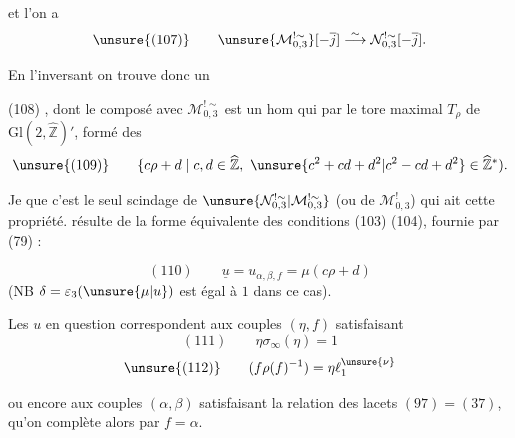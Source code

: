 
et l'on a
\[
 \unsure{(107)}\qquad
 \unsure{\mathcal M_{0,3}^{!\sim}}[-\overline{j}]
 \overset{\sim}{\longrightarrow}
 \mathcal N_{0,3}^{!\sim}[-\overline{j}].
\]

En l'inversant on trouve donc un

(108)
,
dont le composé avec $\mathcal M_{0,3}^{!\sim}$ est un hom qui
par le tore maximal $T_\rho$ de $\mathrm{Gl}(2,\widehat{\mathbb Z})'$,
formé des
\[
 \unsure{(109)}\qquad
 \{c\rho+d\mid c,d\in\widehat{\mathbb Z},\
 \unsure{c^2+cd+d^2|c^2-cd+d^2}\in\widehat{\mathbb Z}^{*}).
\]

Je  que c'est le seul scindage de
$\unsure{\mathcal N_{0,3}^{!\sim}|\mathcal M_{0,3}^{!\sim}}$
(ou  de $\mathcal M_{0,3}^{!}$)
qui ait cette propriété.  résulte de la forme équivalente
des conditions (103) (104), fournie par (79) :



\[
 (110)\qquad
 \underline{u}=u_{\alpha,\beta,f}=\mu(c\rho+d)
\]
(NB $\delta=\varepsilon_3(\unsure{\mu|u})$ est égal à $1$ dans ce cas).

Les $u$ en question correspondent aux couples $(\eta,f)$ satisfaisant
\[
 (111)\qquad \eta\sigma_\infty(\eta)=1
\]
\[
 \unsure{(112)}\qquad
 (f\rho(f)^{-1})=\eta\ell_1^{\unsure{\nu}}
\]



ou encore aux couples $(\alpha,\beta)$ satisfaisant la relation des lacets
$(97)=(37)$, qu'on complète alors par $f=\alpha$.

